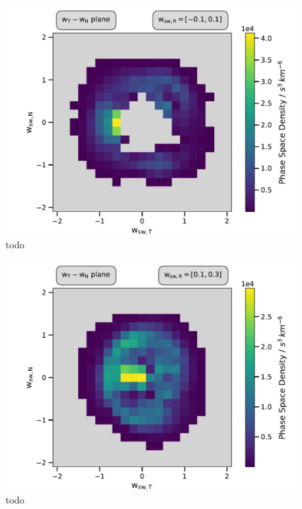 \begin{figure}[h]
	\includegraphics[width=1.\textwidth]{Figures/slices_50_-1.pdf}
	\centering
	\caption{todo}
	\label{fig:todo}
\end{figure}

\begin{figure}[h]
	\includegraphics[width=1.\textwidth]{Figures/slices_50_1.pdf}
	\centering
	\caption{todo}
	\label{fig:todo}
\end{figure}

